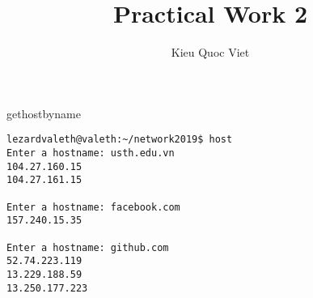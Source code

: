 \documentclass{report}
\title{Practical Work 2}
\author{Kieu Quoc Viet}
\begin{document}
\maketitle

\begin{section}{gethostbyname}
\begin{verbatim}
lezardvaleth@valeth:~/network2019$ host
Enter a hostname: usth.edu.vn
104.27.160.15
104.27.161.15

Enter a hostname: facebook.com
157.240.15.35

Enter a hostname: github.com
52.74.223.119
13.229.188.59
13.250.177.223

\end{verbatim}
\end{section}
\end{document}
